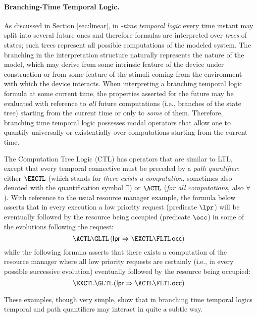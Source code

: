 \paragraph{Branching-Time Temporal Logic.}
As discussed in Section \ref{sec:linear}, in \emph{-time temporal logic} 
every time instant may split into several future ones and therefore 
formulas are interpreted over \emph{trees} of states; such trees 
represent all possible computations of the modeled system. The 
branching in the interpretation structure naturally represents 
the  nature of the model, which may derive from 
some intrinsic feature of the device under construction or from 
some feature of the stimuli coming from the environment with 
which the device interacts. When interpreting a branching temporal 
logic formula at some current time, the properties asserted for 
the future may be evaluated with reference to \emph{all} future 
computations (i.e., branches of the state tree) starting from 
the current time or only to \emph{some} of them. Therefore, branching 
time temporal logic possesses modal operators that allow one 
to quantify universally or existentially over computations starting 
from the current time.

The Computation Tree Logic (CTL) \cite{EH86} has operators that are 
similar to LTL, except that every temporal connective must be 
preceded by a \emph{path quantifier}: either $\EXCTL$ (which stands 
for \emph{there exists a computation}, sometimes also denoted with 
the quantification symbol $\exists$) or $\ACTL$ (\emph{for all computations}, 
also $\forall$). With reference to the usual resource manager 
example, the formula below asserts that in every execution 
a low priority request (predicate $\lpr$) will be eventually followed 
by the resource being occupied (predicate $\occ$) in some of 
the evolutions following the request:
\begin{equation*}
  \ACTL \GLTL \left( \mathsf{lpr} \Rightarrow \EXCTL \FLTL \, \mathsf{occ} \right)
\end{equation*}
while the following formula asserts that there exists a computation 
of the resource manager where all low priority requests are certainly 
(i.e., in every possible successive evolution) eventually followed by the 
resource being occupied: 
\begin{equation*}
  \EXCTL \GLTL  \left( \mathsf{lpr} \Rightarrow \ACTL \FLTL \, \mathsf{occ} \right)
\end{equation*}

These examples, though very simple, show that in branching time
temporal logics temporal and path quantifiers may interact in quite a
subtle way.

